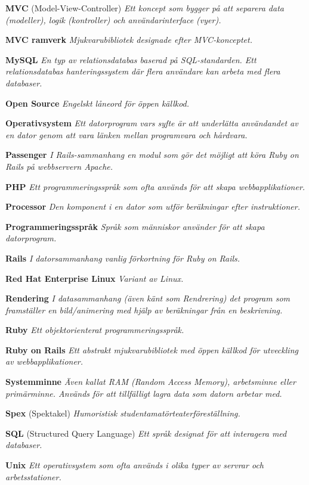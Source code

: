 \documentclass[a4paper, twoside, 11pt, titlepage]{article}
\begin{document}
	\textbf{MVC} (Model-View-Controller) \emph{Ett koncept som bygger på att separera data (modeller), logik (kontroller) och användarinterface (vyer).}

	\textbf{MVC ramverk} \emph{Mjukvarubibliotek designade efter MVC-konceptet.}

	\textbf{MySQL} \emph{En typ av relationsdatabas baserad på SQL-standarden. Ett relationsdatabas hanteringssystem där flera användare kan arbeta med flera databaser.}

	\textbf{Open Source} \emph{Engelskt låneord för öppen källkod.}

	\textbf{Operativsystem} \emph{Ett datorprogram vars syfte är att underlätta användandet av en dator genom att vara länken mellan programvara och hårdvara.}

	\textbf{Passenger} \emph{I Rails-sammanhang en modul som gör det möjligt att köra Ruby on Rails på webbservern Apache.}

	\textbf{PHP} \emph{Ett programmeringsspråk som ofta används för att skapa webbapplikationer.}

	\textbf{Processor} \emph{Den komponent i en dator som utför beräkningar efter instruktioner.}

	\textbf{Programmeringsspråk} \emph{Språk som människor använder för att skapa datorprogram.}

	\textbf{Rails} \emph{I datorsammanhang vanlig förkortning för Ruby on Rails.}

	\textbf{Red Hat Enterprise Linux} \emph{Variant av Linux.}

	\textbf{Rendering} \emph{I datasammanhang (även känt som Rendrering) det program som framställer en bild/animering med hjälp av beräkningar från en beskrivning.}

	\textbf{Ruby} \emph{Ett objektorienterat programmeringsspråk.}

	\textbf{Ruby on Rails} \emph{Ett abstrakt mjukvarubibliotek med öppen källkod för utveckling av webbapplikationer.}

	\textbf{Systemminne} \emph{Även kallat RAM (Random Access Memory), arbetsminne eller primärminne. Används för att tillfälligt lagra data som datorn arbetar med.}

	\textbf{Spex} (Spektakel) \emph{Humoristisk studentamatörteaterföreställning.}

	\textbf{SQL} (Structured Query Language) \emph{Ett språk designat för att interagera med databaser.}

	\textbf{Unix} \emph{Ett operativsystem som ofta används i olika typer av servrar och arbetsstationer.}
\end{document}
